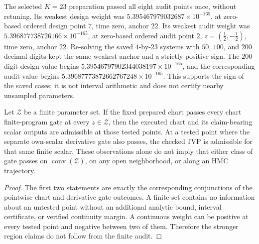 The selected \(K=23\) preparation passed all eight audit points once, without
retuning.  Its weakest design weight was
\(5.395467979032687\times10^{-165}\), at zero-based ordered design point \(7\), time zero,
anchor \(22\).  Its weakest audit weight was
\(5.396877738726166\times10^{-165}\), at
zero-based ordered audit point \(2\), \(z=(\tfrac12,-\tfrac12)\), time zero,
anchor \(22\).  Re-solving the saved
\(4\)-by-\(23\) systems with \(50\), \(100\), and \(200\) decimal digits kept
the same weakest anchor and a strictly positive sign.  The \(200\)-digit design
value begins \(5.39546797902344038197\times10^{-165}\), and the corresponding
audit value begins \(5.39687773872662767248\times10^{-165}\).  This supports
the sign of the saved cases; it is not interval arithmetic and does not certify
nearby unsampled parameters.

\begin{proposition}
\label{prop:bf-ledh-actual-sv-finite-audit-scope}
Let \(\mathcal Z\) be a finite parameter set.  If the fixed prepared chart
passes every chart finite-program gate at every \(z\in\mathcal Z\), then the
executed chart and its claim-bearing scalar outputs are admissible at those
tested points.  At a tested point where the separate own-scalar derivative
gate also passes, the checked JVP is admissible for that same finite scalar.
These observations alone do not imply that either class of gate passes on
\(\operatorname{conv}(\mathcal Z)\), on any open neighborhood, or along an HMC
trajectory.
\end{proposition}

\begin{proof}
The first two statements are exactly the corresponding conjunctions of the
pointwise chart and derivative gate outcomes.
A finite set contains no information about an untested point without an
additional analytic bound, interval certificate, or verified continuity
margin.  A continuous weight can be positive at every tested point and
negative between two of them.  Therefore the stronger region claims do not
follow from the finite audit.
\end{proof}

